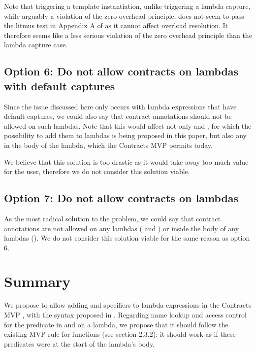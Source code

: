 Note that triggering a template instantiation, unlike triggering a lambda capture, while arguably a violation of the zero overhead principle, does not seem to pass the litmus test in Appendix A of \cite{P2932R2} as it cannot affect overload resolution. It therefore seems like a less serious violation of the zero overhead principle than the lambda capture case.

\subsection*{Option 6: Do not allow contracts on lambdas with default captures}

Since the issue discussed here only occurs with lambda expressions that have default captures, we could also say that contract annotations should not be allowed on such lambdas. Note that this would affect not only  and , for which the possibility to add them to lambdas is being proposed in this paper, but also any  in the body of the lambda, which the Contracts MVP permits today.

We believe that this solution is too drastic as it would take away too much value for the user, therefore we do not consider this solution viable.

\subsection*{Option 7: Do not allow contracts on lambdas}

As the most radical solution to the problem, we could say that contract annotations are not allowed on any lambdas ( and ) or inside the body of any lambdas (). We do not consider this solution viable for the same reason as option 6.

\section{Summary}

We propose to allow adding  and  specifiers to lambda expressions in the Contracts MVP \cite{P2900R2}, with the syntax proposed in \cite{P2961R2}. Regarding name lookup and access control for the predicate in  and  on a lambda,  we propose that it should follow the existing MVP rule for functions (see \cite{P2900R2} section 2.3.2): it should work as-if these predicates were at the start of the lambda's body.

